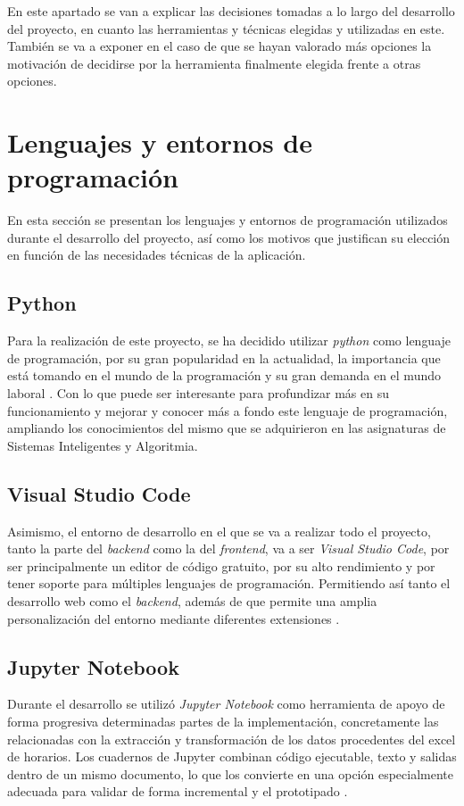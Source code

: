 
En este apartado se van a explicar las decisiones tomadas a lo largo del desarrollo del proyecto, en cuanto las herramientas y técnicas elegidas y utilizadas en este. También se va a exponer en el caso de que se hayan valorado más opciones la motivación de decidirse por la herramienta finalmente elegida frente a otras opciones. 

\section{Lenguajes y entornos de programación}

En esta sección se presentan los lenguajes y entornos de programación utilizados durante el desarrollo del proyecto, así como los motivos que justifican su elección en función de las necesidades técnicas de la aplicación.

\subsection{Python}
Para la realización de este proyecto, se ha decidido utilizar \textit{python} como lenguaje de programación, por su gran popularidad en la actualidad, la importancia que está tomando en el mundo de la programación y su gran demanda en el mundo laboral \cite{python:porque}. Con lo que puede ser interesante para profundizar más en su funcionamiento y mejorar y conocer más a fondo este lenguaje de programación, ampliando los conocimientos del mismo que se adquirieron en las asignaturas de Sistemas Inteligentes y Algoritmia.

\subsection{Visual Studio Code}
Asimismo, el entorno de desarrollo en el que se va a realizar todo el proyecto, tanto la parte del \textit{backend} como la del \textit{frontend}, va a ser \textit{Visual Studio Code}, por ser principalmente un editor de código gratuito, por su alto rendimiento y por tener soporte para múltiples lenguajes de programación. Permitiendo así tanto el desarrollo web como el \textit{backend}, además de que permite una amplia personalización del entorno mediante diferentes extensiones \cite{visualcode:ventajas}.

\subsection{Jupyter Notebook}
Durante el desarrollo se utilizó \textit{Jupyter Notebook} como herramienta de apoyo de forma progresiva determinadas partes de la implementación, concretamente las relacionadas con la extracción y transformación de los datos procedentes del excel de horarios. Los cuadernos de Jupyter combinan código ejecutable, texto y salidas dentro de un mismo documento, lo que los convierte en una opción especialmente adecuada para validar de forma incremental y el prototipado \cite{jupyter_what_is, jupyter_docs}.

